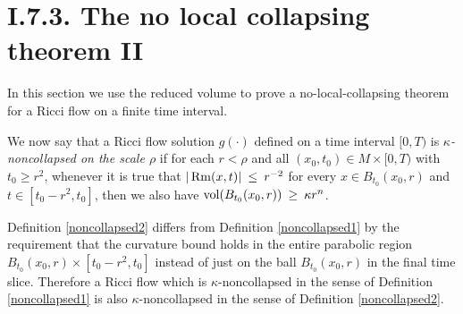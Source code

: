 \section{I.7.3. The no local collapsing theorem II} \label{I.7.3}

In this section we use the reduced volume to prove a no-local-collapsing
theorem for a Ricci flow on a finite time interval.

\begin{definition}
  \label{def:kl-no-local-collapsing-theorem-ii-kappa-noncollapsing}
 \label{noncollapsed2}
We now say that a Ricci flow solution $g(\cdot)$ defined on a time
interval $[0, T)$ is {\em $\kappa$-noncollapsed on the scale
$\rho$} if for each
$r < \rho$ and all $(x_0, t_0) \in M \times [0,T)$
with $t_0 \ge r^2$,
whenever it is true that
$|\operatorname{Rm}(x,t)| \: \le \: r^{-2}$ for every $x \in B_{t_0}(x_0, r)$
and $t \in [t_0 - r^2, t_0]$, then we also have
$\operatorname{vol}(B_{t_0}(x_0, r)) \: \ge \: \kappa r^n$.
\end{definition}

Definition \ref{noncollapsed2} differs from
Definition \ref{noncollapsed1} by the requirement that the
curvature bound holds in the entire parabolic region
$B_{t_0}(x_0, r) \times [t_0 - r^2, t_0]$ instead of just on
the ball $B_{t_0}(x_0, r)$ in the final time slice.  Therefore a Ricci
flow which is $\kappa$-noncollapsed in the sense of
Definition \ref{noncollapsed1} is also
$\kappa$-noncollapsed in the sense of
Definition \ref{noncollapsed2}.

